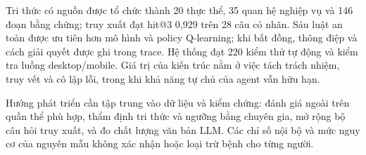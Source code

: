 \documentclass[12pt,a4paper]{report}
\begin{document}
Tri thức có nguồn được tổ chức thành 20 thực thể, 35 quan hệ nghiệp vụ và 146 đoạn bằng chứng; truy xuất đạt hit@3 0,929 trên 28 câu có nhãn. Sáu luật an toàn được ưu tiên hơn mô hình và policy Q-learning; khi bất đồng, thông điệp và cách giải quyết được ghi trong trace. Hệ thống đạt 220 kiểm thử tự động và kiểm tra luồng desktop/mobile. Giá trị của kiến trúc nằm ở việc tách trách nhiệm, truy vết và cô lập lỗi, trong khi khả năng tự chủ của agent vẫn hữu hạn.

Hướng phát triển cần tập trung vào dữ liệu và kiểm chứng: đánh giá ngoài trên quần thể phù hợp, thẩm định tri thức và ngưỡng bằng chuyên gia, mở rộng bộ câu hỏi truy xuất, và đo chất lượng văn bản LLM. Các chỉ số nội bộ và mức nguy cơ của nguyên mẫu không xác nhận hoặc loại trừ bệnh cho từng người.

\end{document}
